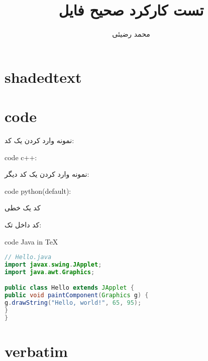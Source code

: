\documentclass[12pt]{article}
\title{تست کارکرد صحیح فایل}
\author{محمد رضیئی}
\begin{document}
\currentpagecolor
{}
\maketitle

\section{shadedtext}
\ptext[1]
\begin{shadedtext}
	\ptext[1-10]
\end{shadedtext}
\ptext[1]

\section{code}
	نمونه وارد کردن یک کد:

\begin{latin}
\noindent code c++:

\end{latin}	

\newlines



نمونه وارد کردن یک کد دیگر:

	
\begin{latin}
\noindent code python(default):

\end{latin}
کد یک خطی

کد داخل تک:
\begin{latin}
\noindent code Java in \TeX
\begin{lstlisting}[language = Java]
// Hello.java
import javax.swing.JApplet;
import java.awt.Graphics;

public class Hello extends JApplet {
public void paintComponent(Graphics g) {
g.drawString("Hello, world!", 65, 95);
}    
}
\end{lstlisting}
\end{latin}
\currentpagecolor

\section{verbatim} %
\end{document}
